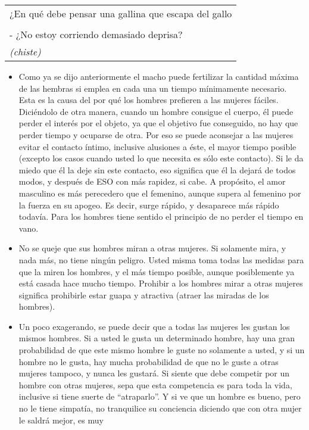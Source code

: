\begin{longtable}[]{@{}l@{}}
\toprule
¿En qué debe pensar una gallina que escapa del gallo\tabularnewline
\tabularnewline
- ¿No estoy corriendo demasiado deprisa?\tabularnewline
\emph{(chiste)}\tabularnewline
\bottomrule
\end{longtable}

\begin{itemize}
\item
  Como ya se dijo anteriormente el macho puede fertilizar la cantidad
  máxima de las hembras si emplea en cada una un tiempo mínimamente
  necesario. Esta es la causa del por qué los hombres prefieren a las
  mujeres fáciles. Diciéndolo de otra manera, cuando un hombre consigue
  el cuerpo, él puede perder el interés por el objeto, ya que el
  objetivo fue conseguido, no hay que perder tiempo y ocuparse de otra.
  Por eso se puede aconsejar a las mujeres evitar el contacto íntimo,
  inclusive alusiones a éste, el mayor tiempo posible (excepto los casos
  cuando usted lo que necesita es sólo este contacto). Si le da miedo
  que él la deje sin este contacto, eso significa que él la dejará de
  todos modos, y después de ESO con más rapidez, si cabe. A propósito,
  el amor masculino es más perecedero que el femenino, aunque supera al
  femenino por la fuerza en su apogeo. Es decir, surge rápido, y
  desaparece más rápido todavía. Para los hombres tiene sentido el
  principio de no perder el tiempo en vano.
\item
  No se queje que sus hombres miran a otras mujeres. Si solamente mira,
  y nada más, no tiene ningún peligro. Usted misma toma todas las
  medidas para que la miren los hombres, y el más tiempo posible, aunque
  posiblemente ya está casada hace mucho tiempo. Prohibir a los hombres
  mirar a otras mujeres significa prohibirle estar guapa y atractiva
  (atraer las miradas de los hombres).
\item
  Un poco exagerando, se puede decir que a todas las mujeres les gustan
  los mismos hombres. Si a usted le gusta un determinado hombre, hay una
  gran probabilidad de que este mismo hombre le guste no solamente a
  usted, y si un hombre no le gusta, hay mucha probabilidad de que no le
  guste a otras mujeres tampoco, y nunca les gustará. Si siente que debe
  competir por un hombre con otras mujeres, sepa que esta competencia es
  para toda la vida, inclusive si tiene suerte de ``atraparlo''. Y si ve
  que un hombre es bueno, pero no le tiene simpatía, no tranquilice su
  conciencia diciendo que con otra mujer le saldrá mejor, es muy

\end{itemize}
